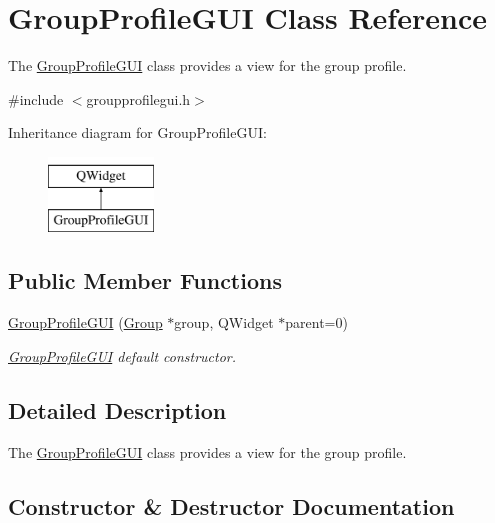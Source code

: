 \hypertarget{classGroupProfileGUI}{}\section{Group\+Profile\+G\+UI Class Reference}
\label{classGroupProfileGUI}


The \hyperlink{classGroupProfileGUI}{Group\+Profile\+G\+UI} class provides a view for the group profile.  




{\ttfamily \#include $<$groupprofilegui.\+h$>$}

Inheritance diagram for Group\+Profile\+G\+UI\+:\begin{figure}[H]
\begin{center}
\leavevmode
\includegraphics[height=2.000000cm]{classGroupProfileGUI}
\end{center}
\end{figure}
\subsection*{Public Member Functions}
\begin{DoxyCompactItemize}
\item 
\hyperlink{classGroupProfileGUI_adf94380bfa993561c18c750d7522301c}{Group\+Profile\+G\+UI} (\hyperlink{classGroup}{Group} $\ast$group, Q\+Widget $\ast$parent=0)
\begin{DoxyCompactList}\small\item\em \hyperlink{classGroupProfileGUI}{Group\+Profile\+G\+UI} default constructor. \end{DoxyCompactList}\end{DoxyCompactItemize}


\subsection{Detailed Description}
The \hyperlink{classGroupProfileGUI}{Group\+Profile\+G\+UI} class provides a view for the group profile. 

\subsection{Constructor \& Destructor Documentation}
